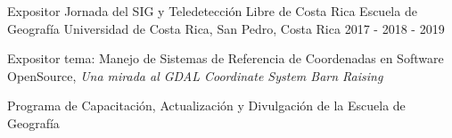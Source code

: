 

\begin{cventries}

  \cventry
  {Expositor} %
  {Jornada del SIG y Teledetección Libre de Costa Rica Escuela de Geografía} %
  {Universidad de Costa Rica, San Pedro, Costa Rica} %
  {2017 - 2018 - 2019} %
  {
    \begin{cvitems} %
      \item Expositor tema: Manejo de Sistemas de Referencia de Coordenadas en
      Software OpenSource, \textit{Una mirada al GDAL Coordinate System Barn
      Raising}
      \item Programa de Capacitación, Actualización y Divulgación de la Escuela
      de Geografía
    \end{cvitems}
  } 
\end{cventries}